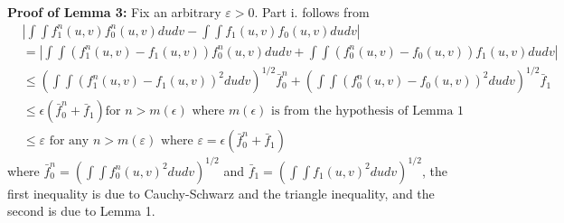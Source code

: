 \documentclass[12pt]{article}
\theoremstyle{definition}
\begin{document}
\begin{flushleft}
\textbf{Proof of Lemma 3:} Fix an arbitrary $\varepsilon > 0$. Part i. follows from
\begin{align*}
&\left|\int\int f^{n}_{1}(u,v)f^{n}_{0}(u,v)dudv -  \int\int f_{1}(u,v)f_{0}(u,v)dudv\right| \\
&= \left|\int\int \left(f^{n}_{1}(u,v)-f_{1}(u,v)\right)f^{n}_{0}(u,v)dudv + \int\int \left(f^{n}_{0}(u,v)-f_{0}(u,v)\right)f_{1}(u,v)dudv\right| \\
&\leq \left(\int\int \left(f^{n}_{1}(u,v)-f_{1}(u,v)\right)^{2}dudv\right)^{1/2}\bar{f}^{n}_{0} + \left(\int\int \left(f^{n}_{0}(u,v)-f_{0}(u,v)\right)^{2}dudv\right)^{1/2}\bar{f}_{1} \\
  &\leq \epsilon \left(\bar{f}^{n}_{0} + \bar{f}_{1}\right) \text{for $n > m(\epsilon)$ where $m(\epsilon)$ is from the hypothesis of Lemma 1}\\
 &\leq \varepsilon \text{ for any $n > m\left(\varepsilon\right)$ where $\varepsilon = \epsilon(\bar{f}^{n}_{0} + \bar{f}_{1})$}
\end{align*}
where $\bar{f}^{n}_{0} = \left(\int\int f^{n}_{0}(u,v)^{2}dudv\right)^{1/2}$ and $\bar{f}_{1} = \left(\int\int f_{1}(u,v)^{2}dudv\right)^{1/2}$, the first inequality is due to Cauchy-Schwarz and the triangle inequality, and the second is due to Lemma 1. \newline


\end{flushleft}
\end{document}

